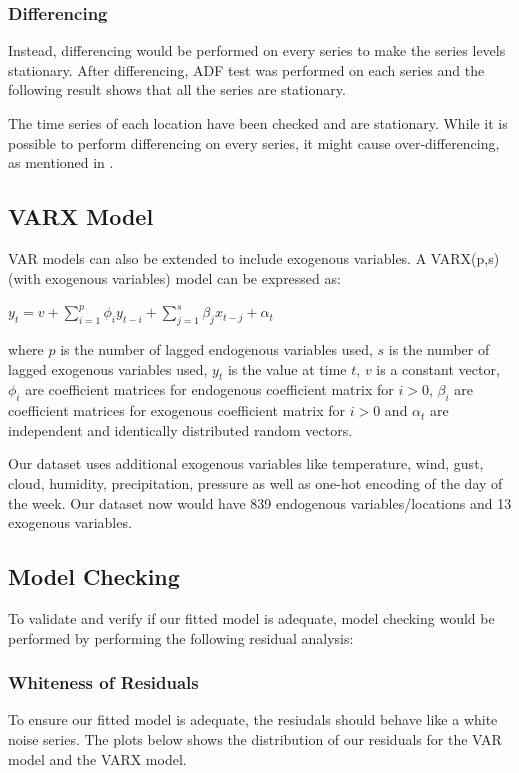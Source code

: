 \documentclass[12pt, letterpaper] {article}
\begin{document}
\subsubsection{Differencing}
Instead, differencing would be performed on every series to make the series levels stationary. After differencing, ADF test was performed on each series and the following result shows that all the series are stationary. 

\noindent The time series of each location have been checked and are stationary. 
While it is possible to perform differencing on every series, it might cause over-differencing, as mentioned in \cite{Ruey2014}.

\subsection{VARX Model}
VAR models can also be extended to include exogenous variables. A VARX(p,s) (with exogenous variables) model can be expressed as:

\begin{center}
    $\displaystyle y_t=v+\sum_{i=1}^{p} \phi_{i}y_{t-i}+\sum_{j=1}^{s} \beta_{j}x_{t-j}+\alpha_t$
\end{center}

\noindent where $p$ is the number of lagged endogenous variables used, $s$ is the number of lagged exogenous variables used, $y_t$ is the value at time $t$, $v$ is a constant vector, $\phi_i$ are coefficient matrices for endogenous coefficient matrix for $i>0$, $\beta_i$ are coefficient matrices for exogenous coefficient matrix for $i>0$ and $\alpha_t$ are independent and identically distributed random vectors. 

\noindent Our dataset uses additional exogenous variables like temperature, wind, gust, cloud, humidity, precipitation, pressure as well as one-hot encoding of the day of the week. Our dataset now would have 839 endogenous variables/locations and 13 exogenous variables.  

\subsection{Model Checking}
To validate and verify if our fitted model is adequate, model checking would be performed by performing the following residual analysis:


\subsubsection{Whiteness of Residuals}
To ensure our fitted model is adequate, the resiudals should behave like a white noise series. 
The plots below shows the distribution of our residuals for the VAR model and the VARX model. 
\end{document}
